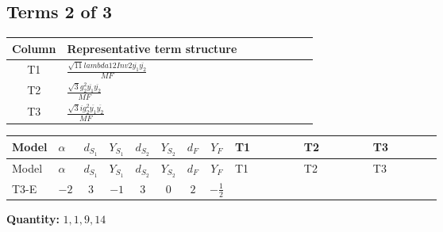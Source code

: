 \documentclass[8pt]{article}
\begin{document}
\begin{landscape}
\subsection*{Terms 2 of 3}
\begin{center}
\begin{tabular}{@{}c >{\raggedright\arraybackslash}p{0.82\linewidth}@{}}
\toprule
Column & Representative term structure \\
\midrule
T1 & \(\displaystyle \frac{\sqrt{11} lambda12Inv2 \overline{y_{1}} \overline{y_{2}}}{MF}\) \\
\midrule
T2 & \(\displaystyle \frac{\sqrt{3} g_{2}^{2} \overline{y_{1}} \overline{y_{2}}}{MF}\) \\
\midrule
T3 & \(\displaystyle \frac{\sqrt{3} i g_{2}^{2} \overline{y_{1}} \overline{y_{2}}}{MF}\) \\
\midrule
\bottomrule
\end{tabular}
\end{center}
\smallskip
\tiny
\begin{longtable}{@{}llcccccc >{\raggedright\arraybackslash}p{0.21\linewidth} >{\raggedright\arraybackslash}p{0.21\linewidth} >{\raggedright\arraybackslash}p{0.21\linewidth}@{}}
\toprule
Model & $\alpha$ & $d_{S_1}$ & $Y_{S_1}$ & $d_{S_2}$ & $Y_{S_2}$ & $d_F$ & $Y_F$ & T1 & T2 & T3 \\
\midrule
\endfirsthead
\toprule
Model & $\alpha$ & $d_{S_1}$ & $Y_{S_1}$ & $d_{S_2}$ & $Y_{S_2}$ & $d_F$ & $Y_F$ & T1 & T2 & T3 \\
\midrule
\endhead
T3-E & $-2$ & $3$ & $-1$ & $3$ & $0$ & $2$ & $-\frac{1}{2}$ & \scriptsize\adjustbox{max width=\linewidth}{$\begin{gathered} \frac{3 \sqrt{11} lambda12Inv2 \overline{y_{1}} \overline{y_{2}}}{22 MF}\end{gathered}$} & \scriptsize\adjustbox{max width=\linewidth}{$\begin{gathered} \frac{49 \sqrt{3} g_{2}^{2} \overline{y_{1}} \overline{y_{2}}}{24 MF}\end{gathered}$} & \scriptsize\adjustbox{max width=\linewidth}{$\begin{gathered} - \frac{\sqrt{3} i g_{2}^{2} \overline{y_{1}} \overline{y_{2}}}{6 MF}\end{gathered}$} \\
\midrule
\bottomrule
\end{longtable}
\clearpage
\noindent\textbf{Quantity: }$\mathrm{1,1,9,14}$\par\smallskip

\end{landscape}
\end{document}

